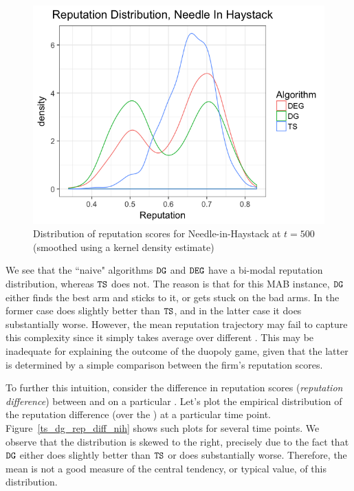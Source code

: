 \documentclass[../competing_bandits.tex]{subfiles}
\begin{document}
\begin{figure}[ht]
\includegraphics[scale=0.35]{figures/rep_distribution_nih}
\caption{Distribution of reputation scores for Needle-in-Haystack at $t=500$ (smoothed using a kernel density estimate)}
\label{rep_dist_nih}
\end{figure}


We see that the ``naive" algorithms $\mathtt{DG}$ and $\mathtt{DEG}$ have a bi-modal reputation distribution, whereas $\mathtt{TS}$ does not. The reason is that for this MAB instance, $\mathtt{DG}$ either finds the best arm and sticks to it, or gets stuck on the bad arms. In the former case \DG does slightly better than $\mathtt{TS}$, and in the latter case it does substantially worse. However, the mean reputation trajectory may fail to capture this complexity since it simply takes average over different \MRVs. This may be inadequate for explaining the outcome of the duopoly game, given that the latter is determined by a simple comparison between the firm's reputation scores. 

To further this intuition, consider the difference in reputation scores (\emph{reputation difference}) between \TS and \DG on a particular \MRV. Let's plot the empirical distribution of the reputation difference (over the \MRVs) at a particular time point. Figure~\ref{ts_dg_rep_diff_nih} shows such plots for several time points. We observe that the distribution is skewed to the right, precisely due to the fact that $\mathtt{DG}$ either does slightly better than $\mathtt{TS}$ or does substantially worse. Therefore, the mean is not a good measure of the central tendency, or typical value, of this distribution. 
\end{document}
